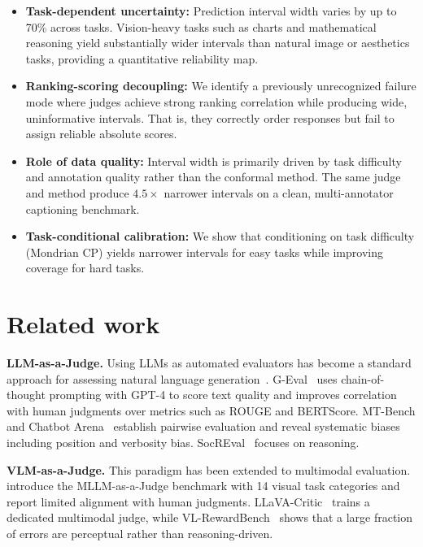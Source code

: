 \documentclass{article}
\begin{document}
\begin{itemize}[leftmargin=*,itemsep=0pt,topsep=0pt]

\item \textbf{Task-dependent uncertainty:} Prediction interval width varies by up to 70\% across tasks. Vision-heavy tasks such as charts and mathematical reasoning yield substantially wider intervals than natural image or aesthetics tasks, providing a quantitative reliability map.

\item \textbf{Ranking-scoring decoupling:} We identify a previously unrecognized failure mode where judges achieve strong ranking correlation while producing wide, uninformative intervals. That is, they correctly order responses but fail to assign reliable absolute scores.

\item \textbf{Role of data quality:} Interval width is primarily driven by task difficulty and annotation quality rather than the conformal method. The same judge and method produce $4.5\times$ narrower intervals on a clean, multi-annotator captioning benchmark.

\item \textbf{Task-conditional calibration:} We show that conditioning on task difficulty (Mondrian CP) yields narrower intervals for easy tasks while improving coverage for hard tasks. \vspace{-3pt}

\end{itemize}

\section{Related work}
\label{sec:related}

\textbf{LLM-as-a-Judge.}
Using LLMs as automated evaluators has become a standard approach for assessing natural language generation~\citep{zheng2023judging,liu2023geval}. G-Eval~\citep{liu2023geval} uses chain-of-thought prompting with GPT-4 to score text quality and improves correlation with human judgments over metrics such as ROUGE and BERTScore. MT-Bench and Chatbot Arena~\citep{zheng2023judging} establish pairwise evaluation and reveal systematic biases including position and verbosity bias. SocREval~\citep{he2024soceval} focuses on reasoning. 

\textbf{VLM-as-a-Judge.}
This paradigm has been extended to multimodal evaluation. \citet{chen2024mllmasajudge} introduce the MLLM-as-a-Judge benchmark with 14 visual task categories and report limited alignment with human judgments. LLaVA-Critic~\citep{xiong2024llavacritic} trains a dedicated multimodal judge, while VL-RewardBench~\citep{li2024vlrewardbench} shows that a large fraction of errors are perceptual rather than reasoning-driven. 
\end{document}
